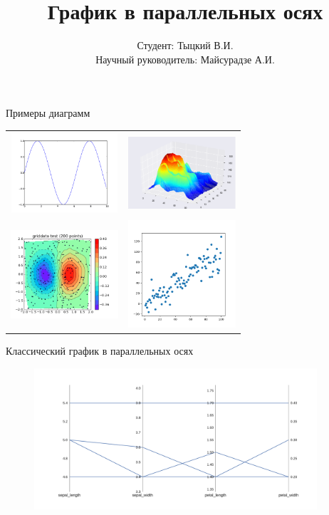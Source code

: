 \documentclass[fleqn, xcolor=x11names]{beamer}
\title{\bfseries График в параллельных осях}
\author[Тыцкий В.И.]{Студент: Тыцкий В.И.\\[1ex]  {\small Научный руководитель: Майсурадзе А.И.}}
\institute[ВМК МГУ]{МГУ имени М. В. Ломоносова, факультет ВМК, кафедра ММП}
\date{}
\begin{document}
\begin{frame}
\titlepage
\end{frame}

\begin{frame}{Примеры диаграмм}
    \centering
    \begin{tabular}{cc}
        \includegraphics[width=4cm]{example_1.png} &
         \includegraphics[width=4cm]{example_2.png} \\
         \includegraphics[width=4cm]{example_3.png} &
         \includegraphics[width=4cm]{example_4.png} 
    \end{tabular}       
\end{frame}

\begin{frame}{Классический график в параллельных осях}
    \begin{figure}[htb]
        \centering
        \includegraphics[width=10.5cm]{classic_pc.pdf}
    \end{figure}
\end{frame}
\end{document}
